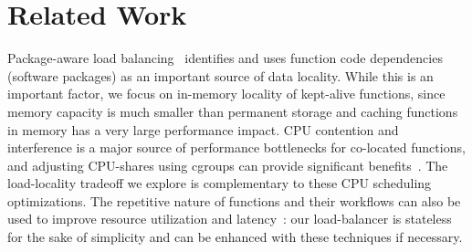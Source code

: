 \section{Related Work}

\begin{comment}
\noindent \textbf{FaaS Resource Management.}
The initialization overheads of serverless functions and their repeated invocations have spawned a great deal of research into optimizing their resource management.
Recent surveys~\cite{faas-survey-jan-2022, raza2021sok, eismann2020serverless, hassan2021survey, mampage2021holistic} provide an overview of the challenges and solutions in this very active research area. 

Reducing the overhead of serverless functions through various systems and virtualization-level mechanisms and  optimizations~\cite{du2020catalyzer, firecracker-nsdi20, dukic2020photons, akkus_sand_2018, vhive-asplos21, carreira2021warm}. 
%
Locality for FaaS resource management has been explored in the form of function keep-alive policies~\cite{shahrad_serverless_2020}. 
Our work builds on and uses the caching-based Greedy-Dual policy from FaasCache~\cite{faascache-asplos21}. 
%
Single-server environments have been the focus of these mechanisms and policies: we have made an initial attempt to understand their interactions in a distributed cluster context.
%
Inter-function dependencies can also be used for predictive resource management and reducing function communication and startup costs~\cite{gunasekaran2020fifer, daw2021speedo, shen2021defuse}: incorporating these policies into our load-balancer is part of future work. 
\end{comment}

Package-aware load balancing~\cite{package-cristina-19}  identifies and uses function code dependencies (software packages) as an important source of data locality.
While this is an important factor, we focus on in-memory locality of kept-alive functions, since memory capacity is much smaller than permanent storage and caching functions in memory has a very large performance impact.
%
CPU contention and interference is a major source of performance bottlenecks for co-located functions, and adjusting CPU-shares using cgroups can provide significant benefits~\cite{suresh2019fnsched, suresh2021servermore, ensure-faas-acsos20}.
%
The load-locality tradeoff we explore is complementary to these CPU scheduling optimizations. 
%
The repetitive nature of functions and their workflows can also be used to improve resource utilization and latency~\cite{hunhoff2020proactive, yu2021faasrank, puru_xanadu_20, przybylski2021data}: our load-balancer is stateless for the sake of simplicity and can be enhanced with these techniques if necessary.


